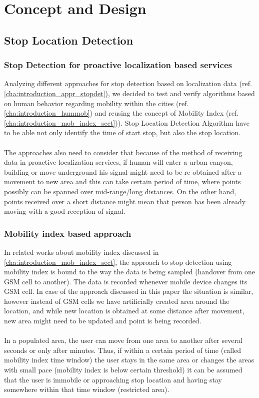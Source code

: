 \chapter{Concept and Design}
\label{cha:conceptanddesign}

\section{Stop Location Detection}

\subsection{Stop Detection for proactive localization based services}
\label{cha:stopdet_proactive}

Analyzing different approaches for stop detection based on localization data (ref. \autoref{cha:introduction_appr_stopdet}), we decided to test and verify algorithms based on human behavior regarding mobility within the cities (ref. \autoref{cha:introduction_hummob}) and reusing the concept of Mobility Index (ref. \autoref{cha:introduction_mob_index_sect})). Stop Location Detection Algorithm have to be able not only identify the time of start stop, but also the stop location.
\\\\
The approaches also need to consider that because of the method of receiving data in proactive localization services, if human will enter a urban canyon, building or move underground his signal might need to be re-obtained after a movement to new area and this can take certain period of time, where points possibly can be spanned over mid-range/long distances. On the other hand, points received over a short distance might mean that person has been already moving with a good reception of signal.

\subsection{Mobility index based approach}
\label{cha:stopdet_mi}

In related works about mobility index discussed in \autoref{cha:introduction_mob_index_sect}, the approach to stop detection using mobility index is bound to the way the data is being sampled (handover from one GSM cell to another). The data is recorded whenever mobile device changes its GSM cell. In case of the approach discussed in this paper the situation is similar, however instead of GSM cells we have artificially created area around the location, and while new location is obtained at some distance after movement, new area might need to be updated and point is being recorded.
\\\\
In a populated area, the user can move from one area to another after several seconds or only after minutes. Thus, if within a certain
period of time (called mobility index time window) the user stays in the same area or changes the areas with small pace (mobility index is below certain threshold) it can be assumed that the user is immobile or approaching stop location and having stay somewhere within that time window (restricted area). 

